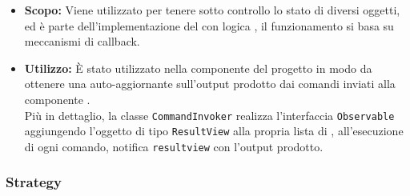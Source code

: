 \documentclass{scalatekids-article}
\begin{document}
\begin{itemize}
\item \textbf{Scopo:} Viene utilizzato per tenere sotto controllo lo stato di diversi oggetti, ed è parte dell'implementazione
  del   con logica , il funzionamento si basa su meccanismi di callback.
\item \textbf{Utilizzo:} È stato utilizzato nella componente  del progetto in modo da ottenere una 
  auto-aggiornante sull'output prodotto dai comandi inviati alla componente .\\
  Più in dettaglio, la classe \verb=CommandInvoker= realizza l'interfaccia \verb=Observable= aggiungendo l'oggetto di tipo
  \verb=ResultView= alla propria lista di , all'esecuzione di ogni comando, notifica \verb=resultview=
  con l'output prodotto.
\end{itemize}

\subsubsection{Strategy}
\end{document}
